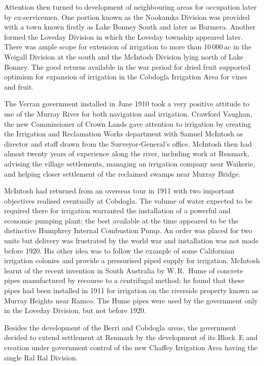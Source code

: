 Attention then turned to development of neighbouring areas for
occupation later by ex-servicemen.  One portion known as the Nookamka
Division was provided with a town known firstly as Lake Bonney South
and later as Barmera.  Another formed the Loveday Division in which
the Loveday township appeared later.  There was ample scope for
extension of irrigation to more than 10\,000\,ac in the Weigall
Division at the south and the McIntosh Division lying north of Lake
Bonney.  The good returns available in the war period for dried fruit
supported optimism for expansion of irrigation in the Cobdogla
Irrigation Area for vines and fruit.

The Verran government installed in June 1910 took a very positive
attitude to use of the Murray River for both navigation and
irrigation.  Crawford Vaughan, the new Commissioner of Crown Lands
gave attention to irrigation by creating the Irrigation and
Reclamation Works department with Samuel McIntosh as director and
staff drawn from the Surveyor-General's office.  McIntosh then had
almost twenty years of experience along the river, including work at
Renmark, advising the village settlements, managing an irrigation
company near Waikerie, and helping closer settlement of the reclaimed
swamps near Murray Bridge.

McIntosh had returned from an overseas tour in 1911 with two important
objectives realised eventually at Cobdogla.  The volume of water
expected to be required there for irrigation warranted the
installation of a powerful and economic pumping plant; the best
available at the time appeared to be the distinctive Humphrey Internal
Combustion Pump.  An order was placed for two units but delivery was
frustrated by the world war and installation was not made before 1920.
His other idea was to follow the example of some Californian
irrigation colonies and provide a pressurised piped supply for
irrigation.  McIntosh learnt of the recent invention in South
Australia by W.\,R.~Hume of concrete pipes manufactured by recourse to
a centrifugal method; he found that these pipes had been installed in
1911 for irrigation on the riverside property known as Murray Heights
near Ramco.  The Hume pipes were used by the government only in the
Loveday Division, but not before 1920.

Besides the development of the Berri and Cobdogla areas, the
government decided to extend settlement at Renmark by the development
of its Block~E and creation under government control of the new
Chaffey Irrigation Area having the single Ral Ral Division.

